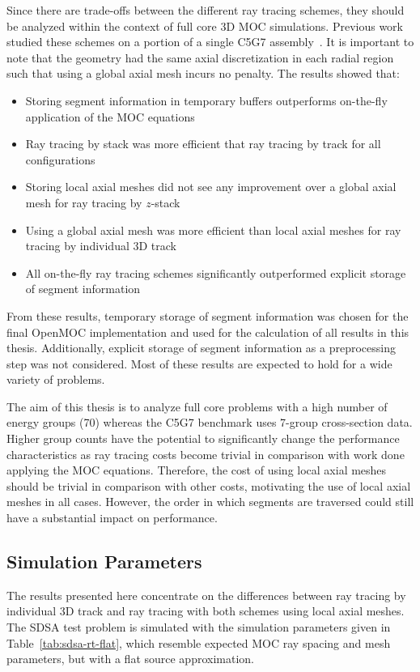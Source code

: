 Since there are trade-offs between the different ray tracing schemes, they should be analyzed within the context of full core 3D \ac{MOC} simulations. Previous work studied these schemes on a portion of a single C5G7 assembly~\cite{physor2016otf}. It is important to note that the geometry had the same axial discretization in each radial region such that using a global axial mesh incurs no penalty. The results showed that:
\begin{itemize}
	\item Storing segment information in temporary buffers outperforms on-the-fly application of the \ac{MOC} equations
	\item Ray tracing by stack was more efficient that ray tracing by track for all configurations
	\item Storing local axial meshes did not see any improvement over a global axial mesh for ray tracing by $z$-stack
	\item Using a global axial mesh was more efficient than local axial meshes for ray tracing by individual 3D track
	\item All on-the-fly ray tracing schemes significantly outperformed explicit storage of segment information
\end{itemize}

From these results, temporary storage of segment information was chosen for the final OpenMOC implementation and used for the calculation of all results in this thesis. Additionally, explicit storage of segment information as a preprocessing step was not considered. Most of these results are expected to hold for a wide variety of problems.

The aim of this thesis is to analyze full core problems with a high number of energy groups (70) whereas the C5G7 benchmark uses 7-group cross-section data. Higher group counts have the potential to significantly change the performance characteristics as ray tracing costs become trivial in comparison with work done applying the \ac{MOC} equations. Therefore, the cost of using local axial meshes should be trivial in comparison with other costs, motivating the use of local axial meshes in all cases. However, the order in which segments are traversed could still have a substantial impact on performance. 

\subsection{Simulation Parameters}

The results presented here concentrate on the differences between ray tracing by individual 3D track and ray tracing with both schemes using local axial meshes. The SDSA test problem is simulated with the simulation parameters given in Table~\ref{tab:sdsa-rt-flat}, which resemble expected \ac{MOC} ray spacing and mesh parameters, but with a flat source approximation.
	
